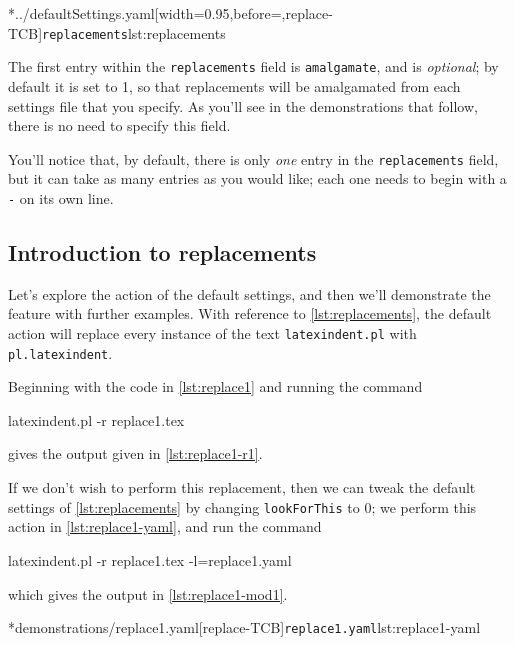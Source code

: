  \cmhlistingsfromfile[style=replacements]*{../defaultSettings.yaml}[width=0.95\linewidth,before=\centering,replace-TCB]{\texttt{replacements}}{lst:replacements}

 The first entry within the \texttt{replacements} field is \texttt{amalgamate}, and
 is \emph{optional}; by default it is set to 1, so that replacements will be
 amalgamated from each settings file that you specify. As you'll see in the demonstrations
 that follow, there is no need to specify this field.

 You'll notice that, by default, there is only \emph{one} entry in the
 \texttt{replacements} field, but it can take as many entries as you would like; each
 one needs to begin with a \texttt{-} on its own line.

\subsection{Introduction to replacements}
	Let's explore the action of the default settings, and then we'll demonstrate the feature
	with further examples. With reference to \cref{lst:replacements}, the default action will
	replace every instance of the text \texttt{latexindent.pl} with \texttt{pl.latexindent}.

	Beginning with the code in \cref{lst:replace1} and running the command
	\begin{commandshell}
latexindent.pl -r replace1.tex
\end{commandshell}
	gives the output given in \cref{lst:replace1-r1}.

	\begin{cmhtcbraster}[raster column skip=.01\linewidth]
	\end{cmhtcbraster}

	If we don't wish to perform this replacement, then we can tweak the default settings of
	\vref{lst:replacements} by changing \texttt{lookForThis} to 0; we perform this action
	in \cref{lst:replace1-yaml}, and run the command
	\begin{commandshell}
latexindent.pl -r replace1.tex -l=replace1.yaml
\end{commandshell}
	which gives the output in \cref{lst:replace1-mod1}.

	\begin{cmhtcbraster}[raster column skip=.01\linewidth]
		\cmhlistingsfromfile[style=yaml-LST]*{demonstrations/replace1.yaml}[replace-TCB]{\texttt{replace1.yaml}}{lst:replace1-yaml}
	\end{cmhtcbraster}


